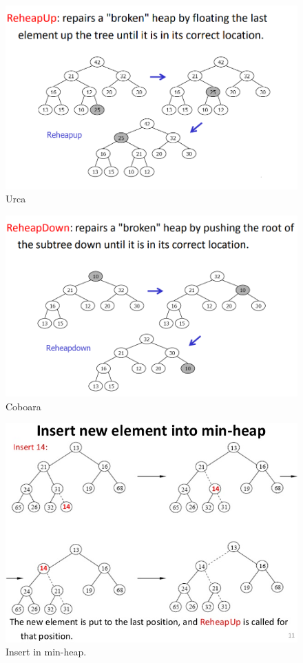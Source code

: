 \documentclass[11pt,a4paper]{article}
\theoremstyle{definition}
\theoremstyle{plain}
\theoremstyle{remark}
\begin{document}
\begin{figure}[H]
    \centering
    \includegraphics[width=0.8\linewidth]{image2.png}
    \caption{Urca}
    \label{fig:enter-label}
\end{figure}

\begin{figure}[H]
    \centering
    \includegraphics[width=0.8\linewidth]{image.png}
    \caption{Coboara}
    \label{fig:enter-label}
\end{figure}

\begin{figure}[H]
    \centering
    \includegraphics[width=0.8\linewidth]{insert-minheap.png}
    \caption{Insert in min-heap.}
    \label{fig:enter-label}
\end{figure}
\end{document}

